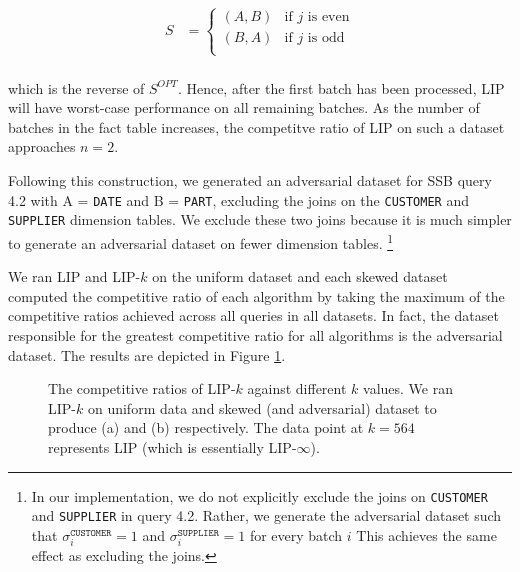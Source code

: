 \begin{align*}
S &= 
    \begin{cases}
    (A, B) & \text{if $j$ is even} \\[0.5em]
    (B, A) & \text{if $j$ is odd} \\
    \end{cases}\\[0.5em]
\end{align*}

which is the reverse of $S^{OPT}$. 
Hence, after the first batch has been processed, LIP will have worst-case performance on all remaining batches. 
As the number of batches in the fact table increases, the competitve ratio of LIP on such a dataset approaches $n =2$.

Following this construction, we generated an adversarial dataset for SSB query 4.2 with A = \texttt{DATE} and B = \texttt{PART},
excluding the joins on the \texttt{CUSTOMER} and \texttt{SUPPLIER} dimension tables.
We exclude these two joins because it is much simpler to generate an adversarial dataset on fewer dimension tables.
\footnote{In our implementation, we do not explicitly exclude the joins on \texttt{CUSTOMER} and \texttt{SUPPLIER} in query 4.2. 
Rather, we generate the adversarial dataset such that $\sigma_i^{\texttt{CUSTOMER}}=1$ and $\sigma_i^{\texttt{SUPPLIER}}=1$ for every batch $i$ 
This achieves the same effect as excluding the joins.}



We ran LIP and LIP-$k$ on the uniform dataset and each skewed dataset computed the competitive ratio of each algorithm by taking the maximum of the competitive ratios achieved across all queries in all datasets. In fact, the dataset responsible for the greatest competitive ratio for all algorithms is the adversarial dataset.  The results are depicted in Figure \ref{fig:cr}. 

\begin{figure}
    \centering

    \quad
    
    \caption{The competitive ratios of LIP-$k$ against different $k$ values. We ran LIP-$k$ on uniform data and skewed (and adversarial) dataset to produce (a) and (b) respectively. The data point at $k = 564$ represents LIP (which is essentially LIP-$\infty$).}
    \label{fig:cr}
\end{figure}

